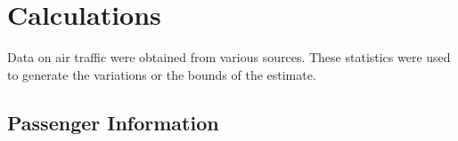 \documentclass[11pt]{article}
\begin{document}
	\section{Calculations}
	Data on air traffic were obtained from various sources. These statistics were used to generate the variations or the bounds of the estimate.

		\subsection{Passenger Information}
\end{document}
